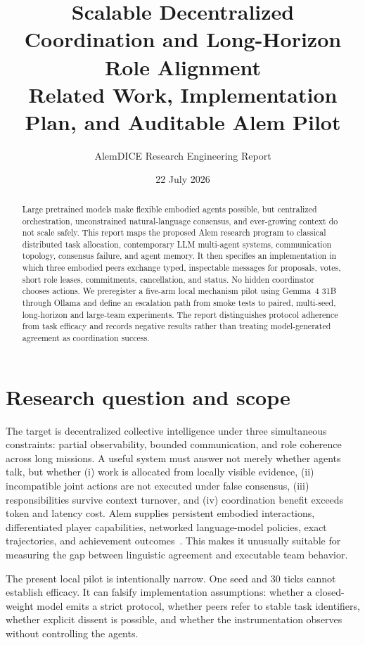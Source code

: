 \documentclass[11pt]{article}
\title{Scalable Decentralized Coordination and Long-Horizon Role Alignment\\
Related Work, Implementation Plan, and Auditable Alem Pilot}
\author{AlemDICE Research Engineering Report}
\date{22 July 2026}
\begin{document}
\maketitle
\begin{abstract}
Large pretrained models make flexible embodied agents possible, but centralized orchestration, unconstrained natural-language consensus, and ever-growing context do not scale safely. This report maps the proposed Alem research program to classical distributed task allocation, contemporary LLM multi-agent systems, communication topology, consensus failure, and agent memory. It then specifies an implementation in which three embodied peers exchange typed, inspectable messages for proposals, votes, short role leases, commitments, cancellation, and status. No hidden coordinator chooses actions. We preregister a five-arm local mechanism pilot using Gemma~4 31B through Ollama and define an escalation path from smoke tests to paired, multi-seed, long-horizon and large-team experiments. The report distinguishes protocol adherence from task efficacy and records negative results rather than treating model-generated agreement as coordination success.
\end{abstract}

\section{Research question and scope}
The target is decentralized collective intelligence under three simultaneous constraints: partial observability, bounded communication, and role coherence across long missions. A useful system must answer not merely whether agents talk, but whether (i) work is allocated from locally visible evidence, (ii) incompatible joint actions are not executed under false consensus, (iii) responsibilities survive context turnover, and (iv) coordination benefit exceeds token and latency cost. Alem supplies persistent embodied interactions, differentiated player capabilities, networked language-model policies, exact trajectories, and achievement outcomes~\citep{alem2026}. This makes it unusually suitable for measuring the gap between linguistic agreement and executable team behavior.

The present local pilot is intentionally narrow. One seed and 30 ticks cannot establish efficacy. It can falsify implementation assumptions: whether a closed-weight model emits a strict protocol, whether peers refer to stable task identifiers, whether explicit dissent is possible, and whether the instrumentation observes without controlling the agents.
\end{document}
